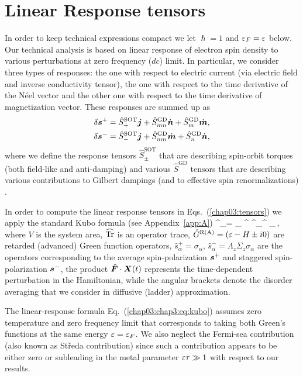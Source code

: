 \section{Linear Response tensors}\label{chap03:sec:appb}
\label{chap03:app:vertexcorrections}
In order to keep technical expressions compact we let $\hslash=1$ and $\varepsilon_F=\varepsilon$ below. Our technical analysis is based on linear response of electron spin density to various perturbations at zero frequency ($dc$) limit. In particular, we consider three types of responses: the one with respect to electric current (via electric field and inverse conductivity tensor), the one with respect to the time derivative of the N\'eel vector 
and the other one with respect to the time derivative of magnetization vector. These responses are summed up as
\beml
\label{chap03:tensors}
\begin{align}
\delta\boldsymbol{s}^+=\hat{S}^\textrm{SOT}_+\boldsymbol{j} +\hat{S}^\textrm{GD}_{mn} \dot{\boldsymbol{n}}+\hat{S}^\textrm{GD}_m\dot{\boldsymbol{m}},\\
\delta\boldsymbol{s}^-=\hat{S}^\textrm{SOT}_-\boldsymbol{j}+\hat{S}^\textrm{GD}_{nm}\dot{\boldsymbol{m}}+\hat{S}^\textrm{GD}_n \dot{\boldsymbol{n}},
\end{align}
\eml
where we define the response tensors $\hat{S}^\textrm{SOT}_\pm$ that are describing spin-orbit torques (both field-like and anti-damping) and various $\hat{S}^\textrm{GD}$ tensors that are describing various contributions to Gilbert dampings (and to effective spin renormalizations) \cite{ado_anisotropy_2019}.

In order to compute the linear response tensors in Eqs.~(\ref{chap03:tensors}) we apply the standard Kubo formula (see Appendix~\ref{app:A})
\be
\label{chap03:chap3:eq:kubo}
\delta{}^\pm_\alpha = 
\s_\beta \widehat{\tr}  \lt\la {}^ ^\pm_\alpha {}^  
_\beta \rt\ra \,,
\e
where $V$ is the system area, $\widehat{\operatorname{Tr}}$ is an operator trace, $\hat{G}^\text{R(A)}=(\varepsilon-H\pm i 0)$ are retarded (advanced) Green function operators, $\hat{s}_\alpha^+ = \sigma_\alpha$, $\hat{s}_\alpha^-=\Lambda_z\Sigma_z\sigma_\alpha$ are the operators corresponding to the average spin-polarization $\boldsymbol{s}^+$ and staggered spin-polarization $\boldsymbol{s}^-$, the product $\hat{\boldsymbol{F}}\cdot \boldsymbol{X}(t)$ represents the time-dependent perturbation in the Hamiltonian, while the angular brackets denote the disorder averaging that we consider in diffusive (ladder) approximation.

The linear-response formula Eq.~(\ref{chap03:chap3:eq:kubo}) assumes zero temperature and zero frequency limit that corresponds to taking both Green's functions at the same energy $\varepsilon=\varepsilon_F$. We also neglect the Fermi-sea contribution (also known as St\v{r}eda contribution) since such a contribution appears to be either zero or subleading in the metal parameter $\varepsilon\tau\gg 1$ with respect to our results.  
 
